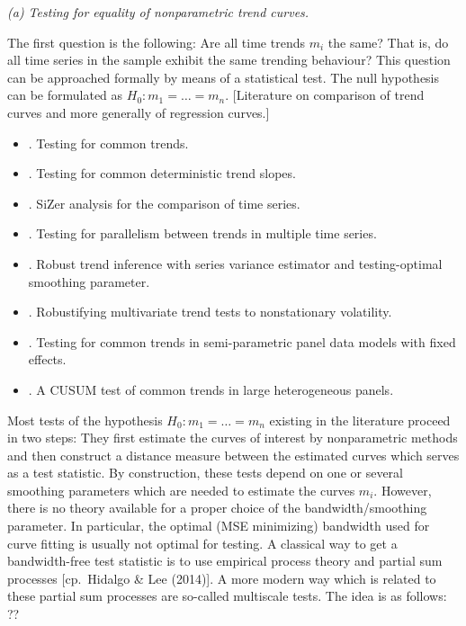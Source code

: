 \documentclass[a4paper,12pt]{article}
\begin{document}
\noindent \textit{(a) Testing for equality of nonparametric trend curves. } 
\vspace{10pt} 

 
\noindent The first question is the following: Are all time trends $m_i$ the same? That is, do all time series in the sample exhibit the same trending behaviour? This question can be approached formally by means of a statistical test. The null hypothesis can be formulated as $H_0: m_1 = \ldots = m_n$. [Literature on comparison of trend curves and more generally of regression curves.] 
\begin{itemize}[label=--,leftmargin=0.5cm]
\item \cite{Stock1988}. Testing for common trends.
\item \cite{Vogelsang2005}. Testing for common deterministic trend slopes.
\item \cite*{Park2009}. SiZer analysis for the comparison of time series.
\item \cite*{DegrasWu2012}. Testing for parallelism between trends in multiple time series.
\item \cite{Sun2011}. Robust trend inference with series variance estimator and testing-optimal smoothing parameter.
\item \cite{Xu2012}. Robustifying multivariate trend tests to nonstationary volatility.
\item \cite*{Zhang2012}. Testing for common trends in semi-parametric panel data models with fixed effects.
\item \cite{Hidalgo2014}. A CUSUM test of common trends in large heterogeneous panels. 
\end{itemize}


Most tests of the hypothesis $H_0: m_1 = \ldots = m_n$ existing in the literature proceed in two steps: They first estimate the curves of interest by nonparametric methods and then construct a distance measure between the estimated curves which serves as a test statistic. By construction, these tests depend on one or several smoothing parameters which are needed to estimate the curves $m_i$. However, there is no theory available for a proper choice of the bandwidth/smoothing parameter. In particular, the optimal (MSE minimizing) bandwidth used for curve fitting is usually not optimal for testing. A classical way to get a bandwidth-free test statistic is to use empirical process theory and partial sum processes [cp.\ Hidalgo \& Lee (2014)]. A more modern way which is related to these partial sum processes are so-called multiscale tests. The idea is as follows: ?? 
\end{document}
